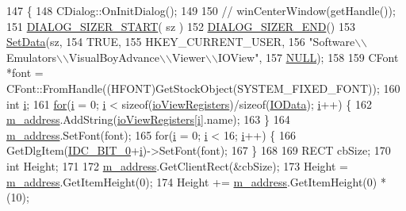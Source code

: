 \begin{DoxyCode}
147 \{
148   CDialog::OnInitDialog();
149   
150   \textcolor{comment}{// winCenterWindow(getHandle());}
151   \mbox{\hyperlink{_resize_dlg_8h_acb9d1d22d9838f6dda8a61cfa132997c}{DIALOG\_SIZER\_START}}( sz )
152     \mbox{\hyperlink{_resize_dlg_8h_aeac0c1e32f30e0763df5736e4b3ea50a}{DIALOG\_SIZER\_END}}()
153     \mbox{\hyperlink{class_resize_dlg_a6a3965f44a0c2f5ba9aaa798a9a81df5}{SetData}}(sz,
154             TRUE,
155             HKEY\_CURRENT\_USER,
156             "Software\(\backslash\)\(\backslash\)Emulators\(\backslash\)\(\backslash\)VisualBoyAdvance\(\backslash\)\(\backslash\)Viewer\(\backslash\)\(\backslash\)IOView",
157             \mbox{\hyperlink{getopt1_8c_a070d2ce7b6bb7e5c05602aa8c308d0c4}{NULL}});
158 
159   CFont *font = CFont::FromHandle((HFONT)GetStockObject(SYSTEM\_FIXED\_FONT));
160   \textcolor{keywordtype}{int} \mbox{\hyperlink{expr-lex_8cpp_acb559820d9ca11295b4500f179ef6392}{i}};
161   \mbox{\hyperlink{expr-lex_8cpp_aa656b692c972ef767f6fe691b696c978}{for}}(\mbox{\hyperlink{expr-lex_8cpp_acb559820d9ca11295b4500f179ef6392}{i}} = 0; \mbox{\hyperlink{expr-lex_8cpp_acb559820d9ca11295b4500f179ef6392}{i}} < sizeof(\mbox{\hyperlink{_i_o_viewer_regs_8h_af3cc3c5a550a35ca8b49166699140ffc}{ioViewRegisters}})/sizeof(\mbox{\hyperlink{struct_i_o_data}{IOData}}); 
      \mbox{\hyperlink{expr-lex_8cpp_acb559820d9ca11295b4500f179ef6392}{i}}++) \{
162     \mbox{\hyperlink{class_i_o_viewer_ab381b72aee2da8c7f3c25ba58c69c3cd}{m\_address}}.AddString(\mbox{\hyperlink{_i_o_viewer_regs_8h_af3cc3c5a550a35ca8b49166699140ffc}{ioViewRegisters}}[\mbox{\hyperlink{expr-lex_8cpp_acb559820d9ca11295b4500f179ef6392}{i}}].name);
163   \}
164   \mbox{\hyperlink{class_i_o_viewer_ab381b72aee2da8c7f3c25ba58c69c3cd}{m\_address}}.SetFont(font);
165   \textcolor{keywordflow}{for}(\mbox{\hyperlink{expr-lex_8cpp_acb559820d9ca11295b4500f179ef6392}{i}} = 0; \mbox{\hyperlink{expr-lex_8cpp_acb559820d9ca11295b4500f179ef6392}{i}} < 16; \mbox{\hyperlink{expr-lex_8cpp_acb559820d9ca11295b4500f179ef6392}{i}}++) \{
166     GetDlgItem(\mbox{\hyperlink{resource_8h_a01e6fe5669dee2629c3b04ae780423af}{IDC\_BIT\_0}}+\mbox{\hyperlink{expr-lex_8cpp_acb559820d9ca11295b4500f179ef6392}{i}})->SetFont(font);
167   \}
168 
169   RECT cbSize;
170   \textcolor{keywordtype}{int} Height;
171   
172   \mbox{\hyperlink{class_i_o_viewer_ab381b72aee2da8c7f3c25ba58c69c3cd}{m\_address}}.GetClientRect(&cbSize);
173   Height = \mbox{\hyperlink{class_i_o_viewer_ab381b72aee2da8c7f3c25ba58c69c3cd}{m\_address}}.GetItemHeight(0);
174   Height += \mbox{\hyperlink{class_i_o_viewer_ab381b72aee2da8c7f3c25ba58c69c3cd}{m\_address}}.GetItemHeight(0) * (10);

\end{DoxyCode}
